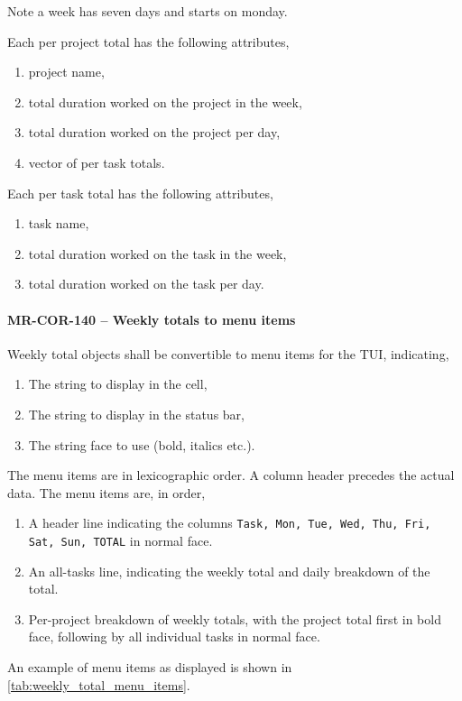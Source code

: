 Note a week has seven days and starts on monday.

Each per project total has the following attributes,
\begin{enumerate}
\item project name,
\item total duration worked on the project in the week,
\item total duration worked on the project per day,
\item vector of per task totals.
\end{enumerate}

Each per task total has the following attributes,
\begin{enumerate}
\item task name,
\item total duration worked on the task in the week,
\item total duration worked on the task per day.
\end{enumerate}

\paragraph{MR-COR-140 -- Weekly totals to menu items}
Weekly total objects shall be convertible to menu items for the TUI,
indicating,
\begin{enumerate}
\item The string to display in the cell,
\item The string to display in the status bar,
\item The string face to use (bold, italics etc.).
\end{enumerate}

The menu items are in lexicographic order. A column header
precedes the actual data. The menu items are, in order,
\begin{enumerate}
\item A header line indicating the columns
  \lstinline{Task, Mon, Tue, Wed, Thu, Fri, Sat, Sun, TOTAL} in normal face.
\item An all-tasks line, indicating the weekly total and daily breakdown of
  the total.
\item Per-project breakdown of weekly totals, with the project total first
  in bold face, following by all individual tasks in normal face.
\end{enumerate}

An example of menu items as displayed is shown in
\cref{tab:weekly_total_menu_items}.

